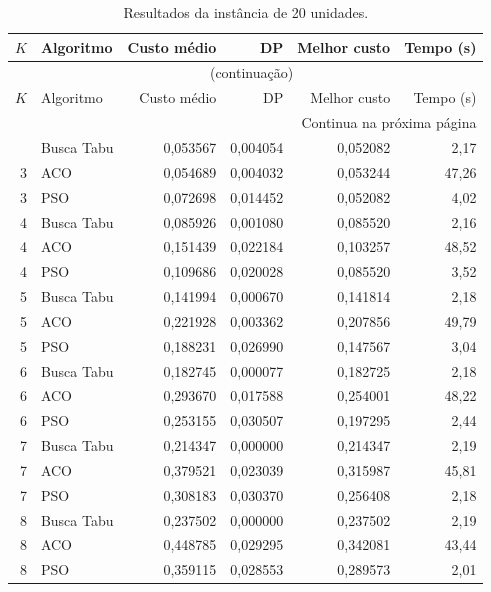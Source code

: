 \begingroup\small
\setlength{\tabcolsep}{5pt}
\begin{longtable}{rlrrrr}
\caption{Resultados da instância de 20 unidades.}\label{tab:resultados-20}\\
\toprule
$K$ & Algoritmo & Custo médio & DP & Melhor custo & Tempo (s) \\
\midrule
\endfirsthead
\multicolumn{6}{c}{\tablename~\thetable{} (continuação)}\\
\toprule
$K$ & Algoritmo & Custo médio & DP & Melhor custo & Tempo (s) \\
\midrule
\endhead
\midrule\multicolumn{6}{r}{Continua na próxima página}\\
\endfoot
\bottomrule
\endlastfoot
3 & Busca Tabu & 0,053567 & 0,004054 & 0,052082 & 2,17 \\
3 & ACO & 0,054689 & 0,004032 & 0,053244 & 47,26 \\
3 & PSO & 0,072698 & 0,014452 & 0,052082 & 4,02 \\
4 & Busca Tabu & 0,085926 & 0,001080 & 0,085520 & 2,16 \\
4 & ACO & 0,151439 & 0,022184 & 0,103257 & 48,52 \\
4 & PSO & 0,109686 & 0,020028 & 0,085520 & 3,52 \\
5 & Busca Tabu & 0,141994 & 0,000670 & 0,141814 & 2,18 \\
5 & ACO & 0,221928 & 0,003362 & 0,207856 & 49,79 \\
5 & PSO & 0,188231 & 0,026990 & 0,147567 & 3,04 \\
6 & Busca Tabu & 0,182745 & 0,000077 & 0,182725 & 2,18 \\
6 & ACO & 0,293670 & 0,017588 & 0,254001 & 48,22 \\
6 & PSO & 0,253155 & 0,030507 & 0,197295 & 2,44 \\
7 & Busca Tabu & 0,214347 & 0,000000 & 0,214347 & 2,19 \\
7 & ACO & 0,379521 & 0,023039 & 0,315987 & 45,81 \\
7 & PSO & 0,308183 & 0,030370 & 0,256408 & 2,18 \\
8 & Busca Tabu & 0,237502 & 0,000000 & 0,237502 & 2,19 \\
8 & ACO & 0,448785 & 0,029295 & 0,342081 & 43,44 \\
8 & PSO & 0,359115 & 0,028553 & 0,289573 & 2,01 \\
\end{longtable}
\endgroup

